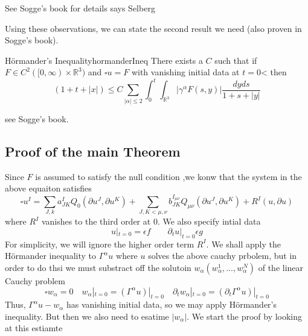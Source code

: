 \documentclass{book}
\newenvironment{Proof}[1][]
  {\begin{ProofTcb}[#1]}
  {\end{ProofTcb}}
\newcommand{\R}{{\mathbb{R}}}
\begin{document}
\begin{Proof}
	See Sogge's book for details says Selberg
\end{Proof}

Using these observations, we can state the second result we need (also proven in Sogge's book).

\begin{thm}{H\"ormander's Inequality}{hormanderIneq}
	There exists a $C$ such that if $F \in C^2([0, \infty)\times \R^3)$ and $\square u  = F$ with vanishing initial
	data at $t = 0$< then
	\[
		(1 + t + |x|) \le C\sum_{|\alpha| \le 2} \int_0^t \int_{\R^3} |\gamma^\alpha F(s,y)|
		\frac{dyds}{1+ s+ |y|}
	\]
\end{thm}

\begin{Proof}
	see Sogge's book.
\end{Proof}

\subsection{Proof of the main Theorem}

Since $F$ is assumed to satisfy the null condition ,we konw that the system in the above equaiton satisfies
\[
	\square u^I = \sum_{J, k} a_{JK}^I Q_0( \partial u^J, \partial u^K  ) + \sum_{J, K< \mu, \nu}
	b_{JK}^{I_{\mu\nu}} Q_{\mu\nu}( \partial u^J, \partial u^K ) + R^I(u, \partial u)
\]
where $R^I$ vanishes to the third order at $0$. We also specify intial data
\[
	u|_{t=0} = \epsilon f\qquad \partial_t u|_{t= 0} \epsilon g
\]
For simplicity, we will ignore the higher order term $R^I$. We shall apply the H\"ormander inequality  to
$\Gamma^\alpha u$ where $u$ solves the above cauchy prbolem, but in order to do thsi we must substract off the solutoin
$w_\alpha( w_\alpha^1, ..., w_\alpha^N )$ of the linear Cauchy problem
\[
	\square w_\alpha = 0 \quad w_\alpha|_{t=0} = (\Gamma^\alpha u)|_{t=0} \quad \partial_t w_\alpha|_{t=0}
	= ( \partial_t \Gamma^\alpha u)|_{t=0}
\]
Thus, $\Gamma^\alpha u - w_\alpha$ has vanishing initial data, so we may apply H\"ormander's inequality. But then we
also need to esatime $|w_\alpha|$. We start the proof by looking at this estiamte
\end{document}
